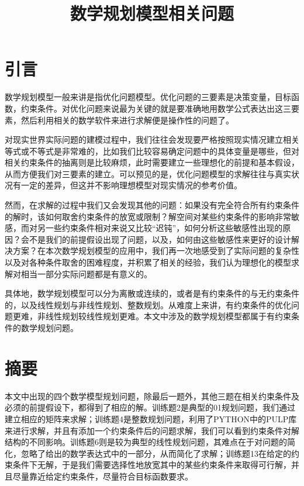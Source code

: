 \documentclass[bachelor,openany,oneside,color]{buaathesis}
\author{}
\date{}
\begin{document}
\pagestyle{mainmatter}

\titlech
\tableofcontents

\hypertarget{header-n2}{%
\title{数学规划模型相关问题}\label{header-n2}}
\mainmatter
\hypertarget{header-n7}{%
\chapter*{引言}\label{header-n7}}
\setcounter{table}{0}\setcounter{figure}{0}数学规划模型一般来讲是指优化问题模型。优化问题的三要素是决策变量，目标函数，约束条件。对优化问题来说最为关键的就是要准确地用数学公式表达出这三要素，然后利用相关的数学软件来进行求解便是操作性的问题了。

对现实世界实际问题的建模过程中，我们往往会发现要严格按照现实情况建立相关等式或不等式是非常难的，比如我们比较容易确定问题中的具体变量是哪些，但对相关约束条件的抽离则是比较麻烦，此时需要建立一些理想化的前提和基本假设，从而方便我们对三要素的建立。可以预见的是，优化问题模型的求解往往与真实状况有一定的差异，但这并不影响理想模型对现实情况的参考价值。

然而，在求解的过程中我们又会发现其他的问题：如果没有完全符合所有约束条件的解时，该如何取舍约束条件的放宽或限制？解空间对某些约束条件的影响非常敏感，而对另一些约束条件相对来说又比较``迟钝''，如何分析这些敏感性出现的原因？会不是我们的前提假设出现了问题，以及，如何由这些敏感性来更好的设计解决方案？在本次数学规划模型的应用中，我们再一次地感受到了实际问题的复杂性以及对各种条件取舍的困难程度，并积累了相关的经验，我们认为理想化的模型求解对相当一部分实际问题都是有意义的。

具体地，数学规划模型可以分为离散或连续的，或者是有约束条件的与无约束条件的，以及线性规划与非线性规划、整数规划。从难度上来讲，有约束条件的优化问题更难，非线性规划较线性规划更难。本文中涉及的数学规划模型都属于有约束条件的数学规划问题。

\hypertarget{header-n12}{%
\chapter*{摘要}\label{header-n12}}
\setcounter{table}{0}\setcounter{figure}{0}本文中出现的四个数学模型规划问题，除最后一题外，其他三题在相关约束条件及必须的前提假设下，都得到了相应的解。训练题2是典型的01规划问题，我们通过建立相应的矩阵来求解；训练题4是整数规划问题，利用了PYTHON中的PULP库来进行求解，并且有添加一个约束条件后的问题求解，我们可以看到约束条件对解结构的不同影响。训练题6则是较为典型的线性规划问题，其难点在于对问题的简化，忽略了给出的数学表达式中的一部分，从而简化了求解；训练题13在给定的约束条件下无解，于是我们需要选择性地放宽其中的某些约束条件来取得可行解，并且尽量靠近给定约束条件，尽量符合目标函数要求。
\end{document}
